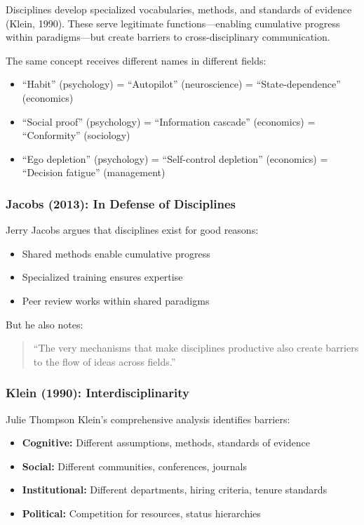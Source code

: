 \documentclass[12pt,a4paper]{article}
\begin{document}
Disciplines develop specialized vocabularies, methods, and standards of evidence (Klein, 1990). These serve legitimate functions---enabling cumulative progress within paradigms---but create barriers to cross-disciplinary communication.

The same concept receives different names in different fields:
\begin{itemize}
\item ``Habit'' (psychology) = ``Autopilot'' (neuroscience) = ``State-dependence'' (economics)
\item ``Social proof'' (psychology) = ``Information cascade'' (economics) = ``Conformity'' (sociology)
\item ``Ego depletion'' (psychology) = ``Self-control depletion'' (economics) = ``Decision fatigue'' (management)
\end{itemize}

\subsubsection{Jacobs (2013): In Defense of Disciplines}

Jerry Jacobs argues that disciplines exist for good reasons:
\begin{itemize}
\item Shared methods enable cumulative progress
\item Specialized training ensures expertise
\item Peer review works within shared paradigms
\end{itemize}

But he also notes:
\begin{quote}
``The very mechanisms that make disciplines productive also create barriers to the flow of ideas across fields.''
\end{quote}

\subsubsection{Klein (1990): Interdisciplinarity}

Julie Thompson Klein's comprehensive analysis identifies barriers:
\begin{itemize}
\item \textbf{Cognitive:} Different assumptions, methods, standards of evidence
\item \textbf{Social:} Different communities, conferences, journals
\item \textbf{Institutional:} Different departments, hiring criteria, tenure standards
\item \textbf{Political:} Competition for resources, status hierarchies
\end{itemize}
\end{document}
